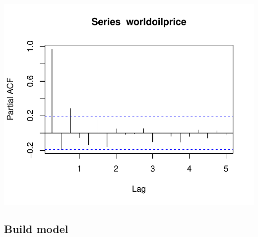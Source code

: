 \documentclass[11pt,preprint, authoryear]{elsarticle}
\numberwithin{equation}{section}
\numberwithin{figure}{section}
\numberwithin{table}{section}
\begin{document}
\begin{center}\includegraphics{README_files/figure-latex/unnamed-chunk-34-2} \end{center}

\hypertarget{build-model}{%
\subsection{Build model}\label{build-model}}
\end{document}
